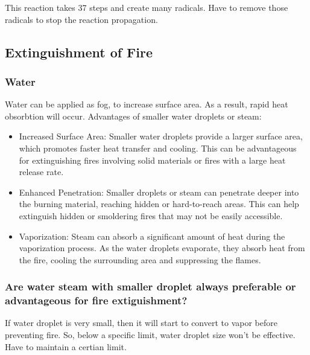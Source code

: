\documentclass{article}
\begin{document}
This reaction takes 37 steps and create many radicals. Have to remove those radicals to stop the reaction propagation. 

\subsection*{Extinguishment of Fire }
\subsubsection*{Water}
Water can be applied as fog, to increase surface area. As a result, rapid heat obsorbtion will occur. Advantages of smaller water droplets or steam:
\begin{itemize}
  \item Increased Surface Area: Smaller water droplets provide a larger surface area, which promotes faster heat transfer and cooling. This can be advantageous for extinguishing fires involving solid materials or fires with a large heat release rate.
  \item Enhanced Penetration: Smaller droplets or steam can penetrate deeper into the burning material, reaching hidden or hard-to-reach areas. This can help extinguish hidden or smoldering fires that may not be easily accessible.
  \item Vaporization: Steam can absorb a significant amount of heat during the vaporization process. As the water droplets evaporate, they absorb heat from the fire, cooling the surrounding area and suppressing the flames. 
\end{itemize}

\subsubsection*{Are water steam with smaller droplet always preferable or advantageous for fire extiguishment?}
If water droplet is very small, then it will start to convert to vapor before preventing fire. So, below a specific limit, water droplet size won't be effective. Have to maintain a certian limit. 
\end{document}
